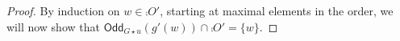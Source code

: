 \documentclass[a4paper,onecolumn,superscriptaddress,11pt,accepted=2020-04-27]{quantumarticle}
\newcommand{\symd}{\mathbin{\Delta}\xspace}
\newcommand{\Symdi}[1]{\underset{\scriptstyle #1}{\scalebox{1.5}{$\symd$}}\,}
\newcommand{\odd}[2]{\textsf{Odd}_{#1}\left(#2\right)}
\theoremstyle{definition}
\begin{document}
\begin{proof}
By induction on $w\in \comp{O'}$, starting at maximal elements in the order, we will now show that $\odd{G\star u}{g'(w)}\cap \comp{O'} =\{w\}$. 
 





\end{proof}
\end{document}

